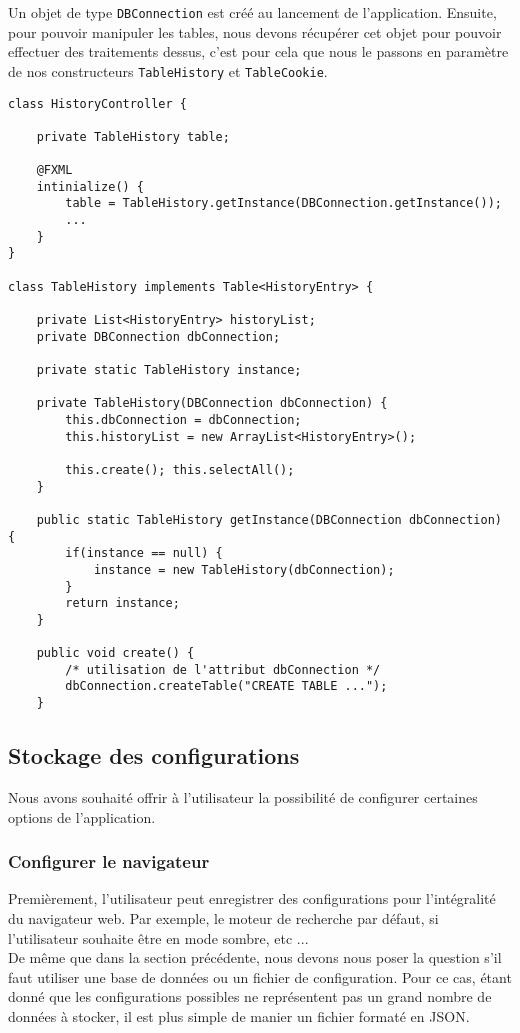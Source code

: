 \documentclass[10pt,a4paper]{article}
\begin{document}
Un objet de type \verb|DBConnection| est créé au lancement de l'application. Ensuite, pour pouvoir manipuler les tables, nous devons récupérer cet objet pour pouvoir effectuer des traitements dessus, c'est pour cela que nous le passons en paramètre de nos constructeurs \verb|TableHistory| et \verb|TableCookie|. \\

\newpage

\begin{lstlisting}
class HistoryController {

	private TableHistory table;    
    
    @FXML
    intinialize() {
        table = TableHistory.getInstance(DBConnection.getInstance());
        ...
    }
}

class TableHistory implements Table<HistoryEntry> {

	private List<HistoryEntry> historyList;
	private DBConnection dbConnection;

	private static TableHistory instance;
	
	private TableHistory(DBConnection dbConnection) {
		this.dbConnection = dbConnection;
		this.historyList = new ArrayList<HistoryEntry>();
		
		this.create(); this.selectAll();
	}
	
	public static TableHistory getInstance(DBConnection dbConnection) {
		if(instance == null) {
			instance = new TableHistory(dbConnection);
		}
		return instance;
	}
	
	public void create() {
	    /* utilisation de l'attribut dbConnection */
		dbConnection.createTable("CREATE TABLE ...");
	}
\end{lstlisting}




\newpage

\subsection{Stockage des configurations}
Nous avons souhaité offrir à l'utilisateur la possibilité de configurer certaines options de l'application. 

\subsubsection{Configurer le navigateur}
Premièrement, l'utilisateur peut enregistrer des configurations pour l'intégralité du navigateur web. Par exemple, le moteur de recherche par défaut, si l'utilisateur souhaite être en mode sombre, etc ... \\
De même que dans la section précédente, nous devons nous poser la question s'il faut utiliser une base de données ou un fichier de configuration. Pour ce cas, étant donné que les configurations possibles ne représentent pas un grand nombre de données à stocker, il est plus simple de manier un fichier formaté en JSON.
\end{document}
